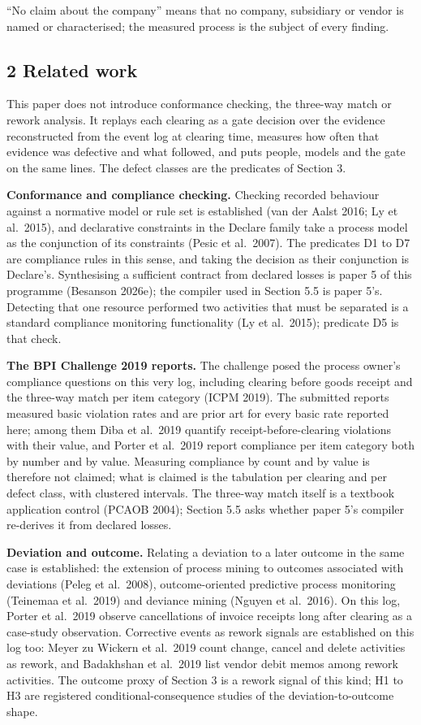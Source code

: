 \documentclass[
  10pt,
]{article}
\begin{document}
``No claim about the company'' means that no company, subsidiary or
vendor is named or characterised; the measured process is the subject of
every finding.

\hypertarget{related-work}{%
\subsection{2 Related work}\label{related-work}}

This paper does not introduce conformance checking, the three-way match
or rework analysis. It replays each clearing as a gate decision over the
evidence reconstructed from the event log at clearing time, measures how
often that evidence was defective and what followed, and puts people,
models and the gate on the same lines. The defect classes are the
predicates of Section 3.

\textbf{Conformance and compliance checking.} Checking recorded
behaviour against a normative model or rule set is established (van der
Aalst 2016; Ly et al.~2015), and declarative constraints in the Declare
family take a process model as the conjunction of its constraints (Pesic
et al.~2007). The predicates D1 to D7 are compliance rules in this
sense, and taking the decision as their conjunction is Declare's.
Synthesising a sufficient contract from declared losses is paper 5 of
this programme (Besanson 2026e); the compiler used in Section 5.5 is
paper 5's. Detecting that one resource performed two activities that
must be separated is a standard compliance monitoring functionality (Ly
et al.~2015); predicate D5 is that check.

\textbf{The BPI Challenge 2019 reports.} The challenge posed the process
owner's compliance questions on this very log, including clearing before
goods receipt and the three-way match per item category (ICPM 2019). The
submitted reports measured basic violation rates and are prior art for
every basic rate reported here; among them Diba et al.~2019 quantify
receipt-before-clearing violations with their value, and Porter et
al.~2019 report compliance per item category both by number and by
value. Measuring compliance by count and by value is therefore not
claimed; what is claimed is the tabulation per clearing and per defect
class, with clustered intervals. The three-way match itself is a
textbook application control (PCAOB 2004); Section 5.5 asks whether
paper 5's compiler re-derives it from declared losses.

\textbf{Deviation and outcome.} Relating a deviation to a later outcome
in the same case is established: the extension of process mining to
outcomes associated with deviations (Peleg et al.~2008),
outcome-oriented predictive process monitoring (Teinemaa et al.~2019)
and deviance mining (Nguyen et al.~2016). On this log, Porter et
al.~2019 observe cancellations of invoice receipts long after clearing
as a case-study observation. Corrective events as rework signals are
established on this log too: Meyer zu Wickern et al.~2019 count change,
cancel and delete activities as rework, and Badakhshan et al.~2019 list
vendor debit memos among rework activities. The outcome proxy of Section
3 is a rework signal of this kind; H1 to H3 are registered
conditional-consequence studies of the deviation-to-outcome shape.
\end{document}
